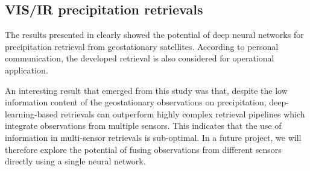 \subsection{VIS/IR precipitation retrievals}

The results presented in \citet{pfreundschuh22b} clearly showed the
potential of deep neural networks for precipitation retrieval from
geostationary satellites. According to personal communication, the
developed retrieval is also considered for operational application.

An interesting result that emerged from this study was that, despite the low
information content of the geostationary observations on precipitation,
deep-learning-based retrievals can outperform highly complex retrieval pipelines
which integrate observations from multiple sensors. This indicates that the use
of information in multi-sensor retrievals is sub-optimal. In a future project,
we will therefore explore the potential of fusing observations from different
sensors directly using a single neural network.
